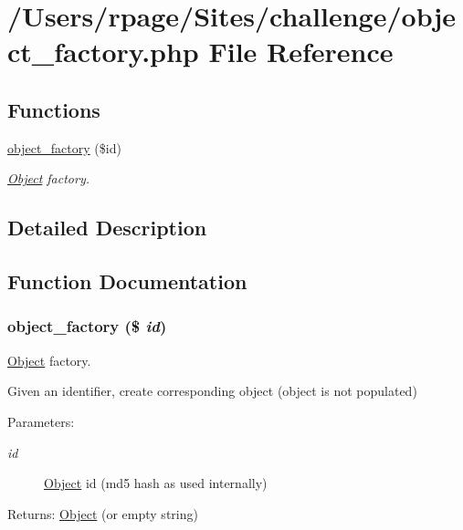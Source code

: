 \hypertarget{object__factory_8php}{
\section{/Users/rpage/Sites/challenge/object\_\-factory.php File Reference}
\label{object__factory_8php}
}
\subsection*{Functions}
\begin{CompactItemize}
\item 
\hyperlink{object__factory_8php_d162993bd3ea2f8d31e01ad002d464b7}{object\_\-factory} (\$id)
\begin{CompactList}\small\item\em \hyperlink{class_object}{Object} factory. \item\end{CompactList}\end{CompactItemize}


\subsection{Detailed Description}


\subsection{Function Documentation}
\hypertarget{object__factory_8php_d162993bd3ea2f8d31e01ad002d464b7}{
\subsubsection{\setlength{\rightskip}{0pt plus 5cm}object\_\-factory (\$ {\em id})}}
\label{object__factory_8php_d162993bd3ea2f8d31e01ad002d464b7}


\hyperlink{class_object}{Object} factory. 

Given an identifier, create corresponding object (object is not populated)

\begin{Desc}
\item[Parameters:]
\begin{description}
\item[{\em id}]\hyperlink{class_object}{Object} id (md5 hash as used internally)\end{description}
\end{Desc}
\begin{Desc}
\item[Returns:]\hyperlink{class_object}{Object} (or empty string) \end{Desc}
